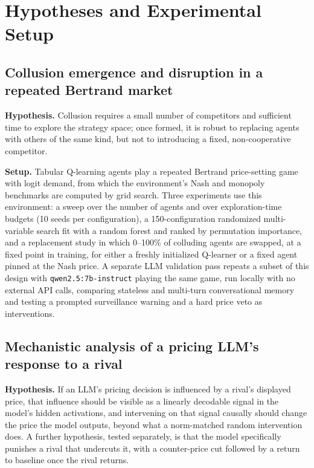 \documentclass[11pt]{article}
\begin{document}
\section{Hypotheses and Experimental Setup}

\subsection{Collusion emergence and disruption in a repeated Bertrand market}

\textbf{Hypothesis.} Collusion requires a small number of competitors and sufficient time to explore the strategy space; once formed, it is robust to replacing agents with others of the same kind, but not to introducing a fixed, non-cooperative competitor.

\textbf{Setup.} Tabular Q-learning agents play a repeated Bertrand price-setting game with logit demand, from which the environment's Nash and monopoly benchmarks are computed by grid search. Three experiments use this environment: a sweep over the number of agents and over exploration-time budgets (10 seeds per configuration), a 150-configuration randomized multi-variable search fit with a random forest and ranked by permutation importance, and a replacement study in which 0--100\% of colluding agents are swapped, at a fixed point in training, for either a freshly initialized Q-learner or a fixed agent pinned at the Nash price. A separate LLM validation pass repeats a subset of this design with \texttt{qwen2.5:7b-instruct} playing the same game, run locally with no external API calls, comparing stateless and multi-turn conversational memory and testing a prompted surveillance warning and a hard price veto as interventions.

\subsection{Mechanistic analysis of a pricing LLM's response to a rival}

\textbf{Hypothesis.} If an LLM's pricing decision is influenced by a rival's displayed price, that influence should be visible as a linearly decodable signal in the model's hidden activations, and intervening on that signal causally should change the price the model outputs, beyond what a norm-matched random intervention does. A further hypothesis, tested separately, is that the model specifically punishes a rival that undercuts it, with a counter-price cut followed by a return to baseline once the rival returns.
\end{document}
